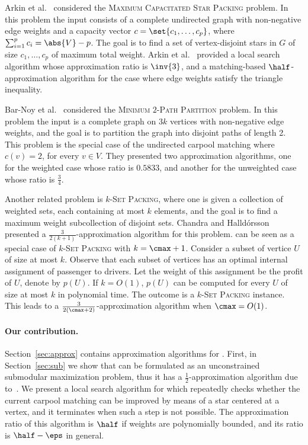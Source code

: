 Arkin et al.~\cite{arkin2004approximations} considered
the \textsc{Maximum Capacitated Star Packing} problem.  In this
problem the input consists of a complete undirected graph with
non-negative edge weights and a capacity vector $c
= \set{c_1,\ldots,c_p}$, where $\sum_{i=1}^p c_i = \abs{V} - p$.  The
goal is to find a set of vertex-disjoint stars in $G$ of size
$c_1,\ldots,c_p$ of maximum total weight.  Arkin et
al.~\cite{arkin2004approximations} provided a local search algorithm
whose approximation ratio is $\inv{3}$, and a matching-based
$\half$-approximation algorithm for the case where edge weights
satisfy the triangle inequality.

Bar-Noy et al.~\cite{bar2015improved} considered the
\textsc{Minimum $2$-Path Partition} problem.
In this problem the input is a complete graph on $3k$ vertices with
non-negative edge weights, and the goal is to partition the graph into
disjoint paths of length 2.  This problem is the special case of the
undirected carpool matching where $c(v) = 2$, for every $v \in V$.
They presented two approximation algorithms, one for the weighted case
whose ratio is $0.5833$, and another for the unweighted case whose
ratio is $\frac{3}{4}$.

Another related problem is \textsc{$k$-Set Packing}, where one is
given a collection of weighted sets, each containing at most $k$
elements, and the goal is to find a maximum weight subcollection of
disjoint sets.  Chandra and Halld\'orsson~\cite{chandra2001greedy}
presented a $\frac{3}{2(k+1)}$-approximation algorithm for this
problem.
%
\carpool can be seen as a special case of \textsc{$k$-Set Packing}
with $k = \cmax + 1$.  Consider a subset of vertice $U$ of size at
most $k$.  Observe that each subset of vertices has an optimal
internal assignment of passenger to drivers.  Let the weight of this
assignment be the profit of $U$, denote by $p(U)$.  If $k = O(1)$,
$p(U)$ can be computed for every $U$ of size at most $k$ in polynomial
time.  The outcome is a \textsc{$k$-Set Packing} instance.  This leads
to a $\frac{3}{2(\cmax+2)}$-approximation algorithm
when $\cmax = O(1)$.



\paragraph*{Our contribution.}
%
Section~\ref{sec:approx} contains approximation algorithms
for \carpool.  First, in Section~\ref{sec:sub} we show that \carpool
can be formulated as an unconstrained submodular maximization problem,
thus it has a $\frac{1}{2}$-approximation algorithm due
to~\cite{BFNS15,buchbinder2016deterministic}.
%
We present a local search algorithm for \carpool which repeatedly
checks whether the current carpool matching can be improved by means
of a star centered at a vertex, and it terminates when such a step is
not possible.
%
The approximation ratio of this algorithm is $\half$ if weights are
polynomially bounded, and its ratio is $\half-\eps$ in general.

